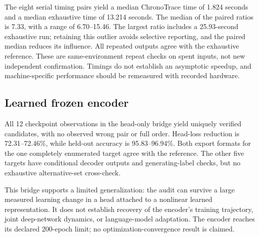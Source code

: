 The eight serial timing pairs yield a median ChronoTrace time of 1.824 seconds and a median exhaustive time of 13.214 seconds. The median of the paired ratios is 7.33, with a range of 6.70--15.46. The largest ratio includes a 25.93-second exhaustive run; retaining this outlier avoids selective reporting, and the paired median reduces its influence. All repeated outputs agree with the exhaustive reference. These are same-environment repeat checks on spent inputs, not new independent confirmation. Timings do not establish an asymptotic speedup, and machine-specific performance should be remeasured with recorded hardware.



\subsection{Learned frozen encoder}
All 12 checkpoint observations in the head-only bridge yield uniquely verified candidates, with no observed wrong pair or full order. Head-loss reduction is 72.31--72.46\%, while held-out accuracy is 95.83--96.94\%. Both export formats for the one completely enumerated target agree with the reference. The other five targets have conditional decoder outputs and generating-label checks, but no exhaustive alternative-set cross-check.

This bridge supports a limited generalization: the audit can survive a large measured learning change in a head attached to a nonlinear learned representation. It does not establish recovery of the encoder's training trajectory, joint deep-network dynamics, or language-model adaptation. The encoder reaches its declared 200-epoch limit; no optimization-convergence result is claimed.

